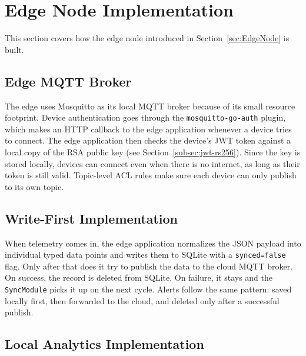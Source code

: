 
\section{Edge Node Implementation}
\label{sec:EdgeNodeImplementation}

This section covers how the edge node introduced in Section~\ref{sec:EdgeNode} is built.

\subsection{Edge MQTT Broker}
\label{subsec:EdgeMQTTBrokerImpl}

The edge uses Mosquitto as its local \gls{MQTT} broker because of its small resource footprint. Device authentication goes through the \texttt{mosquitto-go-auth} plugin, which makes an \gls{HTTP} callback to the edge application whenever a device tries to connect. The edge application then checks the device's \gls{JWT} token against a local copy of the \gls{RSA} public key (see Section~\ref{subsec:jwt-rs256}). Since the key is stored locally, devices can connect even when there is no internet, as long as their token is still valid. Topic-level \gls{ACL} rules make sure each device can only publish to its own topic.

\subsection{Write-First Implementation}
\label{subsec:WriteFirstImpl}

When telemetry comes in, the edge application normalizes the \gls{JSON} payload into individual typed data points and writes them to SQLite with a \texttt{synced=false} flag. Only after that does it try to publish the data to the cloud \gls{MQTT} broker. On success, the record is deleted from SQLite. On failure, it stays and the \texttt{SyncModule} picks it up on the next cycle. Alerts follow the same pattern: saved locally first, then forwarded to the cloud, and deleted only after a successful publish.

\subsection{Local Analytics Implementation}
\label{subsec:LocalAnalyticsImpl}

